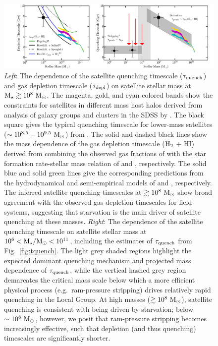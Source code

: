 \documentclass[usenatbib]{mn2e}
\newcommand{\mstar}{{\rm M}_{\star}}
\newcommand{\msun}{{\rm M}_{\odot}}
\begin{document}
\begin{figure}
 \centering
 \hspace*{-0.48in}
   \includegraphics[width=7.6in]{f6.png}
   \caption{\emph{Left}: The dependence of the satellite quenching
     timescale ($\tau_{\rm quench}$) and gas depletion timescale
     ($\tau_{\rm depl}$) on satellite stellar mass at $\mstar \gtrsim
     10^{8}~\msun$. The magenta, gold, and cyan colored bands show the
     constraints for satellites in different mass host halos derived
     from analysis of galaxy groups and clusters in the SDSS by
     \citet{wetzel13}. The black square gives the typical quenching
     timescale for lower-mass satellites ($\sim
     10^{8.5}-10^{9.5}~\msun$) from \citet{wheeler14}. The solid and
     dashed black lines show the mass dependence of the gas depletion
     timescale (${\rm H}_{2}$ + H{\scriptsize I}) derived from
     combining the observed gas fractions of \citet{boselli14} with
     the star formation rate-stellar mass relation of \citet{salim07}
     and \citet{speagle14}, respectively. The solid blue and solid
     green lines give the corresponding predictions from the
     hydrodynamical and semi-empirical models of \citet{dave11a} and
     \citet{popping15}, respectively. The inferred satellite quenching
     timescales at $\gtrsim10^{8}~\msun$ show broad agreement with the
     observed gas depletion timescales for field systems, suggesting
     that starvation is the main driver of satellite quenching at
     these masses. \emph{Right}: The dependence of the satellite
     quenching timescale on satellite stellar mass at $10^{6} <
     \mstar/\msun < 10^{11}$, including the estimates of $\tau_{\rm
       quench}$ from Fig.~\ref{fig:tquench}. The light grey shaded
     regions highlight the expected dominant quenching mechanism and
     projected mass dependence of $\tau_{\rm quench}$, while the
     vertical hashed grey region demarcates the critical mass scale
     below which a more efficient physical process (e.g.~ram-pressure
     stripping) drives relatively rapid quenching in the Local
     Group. At high masses ($\gtrsim10^{8}~\msun$), satellite
     quenching is consistent with being driven by starvation; below
     $\sim10^{8}~\msun$, however, we posit that ram-pressure stripping
     becomes increasingly effective, such that depletion (and thus
     quenching) timescales are significantly shorter.}

 \label{fig:cartoon}
\end{figure}
\end{document}
